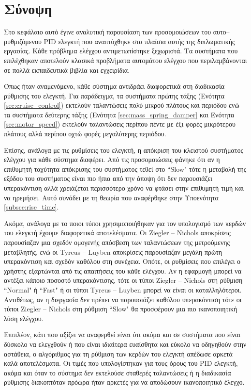 \section{Σύνοψη}

Στο κεφάλαιο αυτό έγινε αναλυτική παρουσίαση των προσομοιώσεων του αυτο--ρυθμιζόμενου PID ελεγκτή που αναπτύχθηκε στα πλαίσια αυτής της διπλωματικής εργασίας. Κάθε πρόβλημα ελέγχου αντιμετωπίστηκε ξεχωριστά. Τα συστήματα που επιλέχθηκαν αποτελούν κλασικά προβλήματα αυτομάτου ελέγχου που περιλαμβάνονται σε πολλά εκπαιδευτικά βιβλία και εγχειρίδια.

Όπως ήταν αναμενόμενο, κάθε σύστημα αντιδράει διαφορετικά στη διαδικασία ρύθμισης του ελεγκτή. Για παράδειγμα, τα συστήματα πρώτης τάξης (Ενότητα \ref{sec:cruise_control}) εκτελούν ταλαντώσεις πολύ μικρού πλάτους και περιόδου ενώ τα συστήματα δεύτερης τάξης (Ενότητα \ref{sec:mass_spring_damper} και Ενότητα \ref{sec:motor_speed}) εκτελούν ταλαντώσεις περίπου πέντε με έξι φορές μικρότερου πλάτους αλλά περίπου οχτώ φορές μεγαλύτερης περιόδου. 

Επίσης, ανάλογα με τις ρυθμίσεις του ελεγκτή, η απόκριση του κλειστού συστήματος ελέγχου για κάθε σύστημα διαφέρει. Από τις προσομοιώσεις φάνηκε ότι αν η επιθυμητή ταχύτητα απόκρισης του συστήματος τεθεί στο ``Slow" τότε η μεταβολή της εξόδου του συστήματος είναι πιο ήπια από την άποψη ότι δεν παρουσιάζει υπερακόντιση αλλά χρειάζεται περισσότερο χρόνο να φτάσει στην επιθυμητή τιμή και να ηρεμήσει. Αυτό συνάδει με τη θεωρία που αναφέρθηκε στην Υποενότητα \ref{subsce:rise_time}. 

Ακόμα, ανάλογα με το ποιοι τύποι χρησιμοποιήθηκαν για τον υπολογισμό των κερδών του ελεγκτή έχουμε διαφορετικά αποτελέσματα. Οι Ziegler -- Nichols αποκρίσεις παρουσίαζαν μια σχεδόν ομογενής απόσβεση των ταλαντώσεων της μετρούμενης μεταβλητής, ενώ οι Tyreus -- Luyben αποκρίσεις παρουσίαζαν μεγάλη πρώτη υπερακόντιση και σχεδόν καθόλου στη συνέχεια. Οπότε, οι ρυθμίσεις που επιλέγει ο χρήστης εξαρτώνται από τις απαιτήσεις του κάθε ελέγχου. Αν η εφαρμογή μπορεί να αντέξει κάποιο ποσοστό υπερακόντισης, τότε οι τύποι Ziegler -- Nichols στη ρύθμιση ``Normal" ή ``Fast" ή οι τύποι Tyreus -- Luyben μπορεί να είναι οι καταλληλότεροι. Αντιθέτως, αν η διεργασία δεν πρέπει να παρουσιάζει καθόλου υπερακόντιση τότε οι τύποι Ziegler -- Nichols στη ρύθμιση ``Slow" θα προσφέρουν μια πιο ικανοποιητική λύση ελέγχου.

Επιπλέον, κάτι που αξίζει να αναφερθεί είναι ότι ακόμα και σε συστήματα που είναι δύσκολο να ελεγχθούν ή που είναι ιδιαίτερα ευαίσθητα και εύκολο να οδηγηθούν στην αστάθεια, ο αλγόριθμος για τη ρύθμιση των κερδών του ελεγκτή απέδωσε αρκετά καλά αποτελέσματα. Οι τιμές που υπολογίστηκαν για τους όρους του PID ελεγκτή, ακόμα και όταν το σύστημα δεν εκτελούσε σταθερές ταλαντώσεις ή η διαδικασία ρύθμισης διακοπτόταν πρόωρα ήταν αρκετές για να αποδώσουν ικανοποιητικό έλεγχο.

